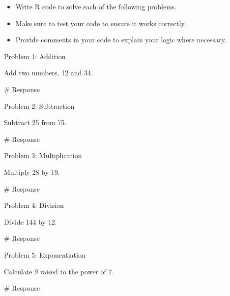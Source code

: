 \documentclass[
  letterpaper,
  DIV=11,
  numbers=noendperiod]{scrreprt}
\newenvironment{Shaded}{\begin{snugshade}}{\end{snugshade}}
\newcommand{\CommentTok}[1]{\textcolor[rgb]{0.37,0.37,0.37}{#1}}
\providecommand{\tightlist}{%
  \setlength{\itemsep}{0pt}\setlength{\parskip}{0pt}}\usepackage{longtable,booktabs,array}
\begin{document}
\begin{itemize}
\tightlist
\item
  Write R code to solve each of the following problems.
\item
  Make sure to test your code to ensure it works correctly.
\item
  Provide comments in your code to explain your logic where necessary.
\end{itemize}

Problem 1: Addition

Add two numbers, 12 and 34.

\begin{Shaded}
\begin{Highlighting}[]
\CommentTok{\# Response}
\end{Highlighting}
\end{Shaded}

Problem 2: Subtraction

Subtract 25 from 75.

\begin{Shaded}
\begin{Highlighting}[]
\CommentTok{\# Response}
\end{Highlighting}
\end{Shaded}

Problem 3: Multiplication

Multiply 28 by 19.

\begin{Shaded}
\begin{Highlighting}[]
\CommentTok{\# Response}
\end{Highlighting}
\end{Shaded}

Problem 4: Division

Divide 144 by 12.

\begin{Shaded}
\begin{Highlighting}[]
\CommentTok{\# Response}
\end{Highlighting}
\end{Shaded}

Problem 5: Exponentiation

Calculate 9 raised to the power of 7.

\begin{Shaded}
\begin{Highlighting}[]
\CommentTok{\# Response}
\end{Highlighting}
\end{Shaded}
\end{document}

